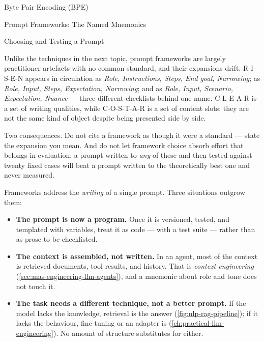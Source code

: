 \begin{v3topic}{Byte Pair Encoding (BPE)}
\begin{v3topic}{Prompt Frameworks: The Named Mnemonics}
\begin{v3topic}{Choosing and Testing a Prompt}
\begin{cautionbox}
Unlike the techniques in the next topic, prompt frameworks are largely
practitioner artefacts with no common standard, and their expansions drift.
R-I-S-E-N appears in circulation as \emph{Role, Instructions, Steps, End goal,
Narrowing}; as \emph{Role, Input, Steps, Expectation, Narrowing}; and as
\emph{Role, Input, Scenario, Expectation, Nuance} --- three different
checklists behind one name. C-L-E-A-R is a set of writing qualities, while
C-O-S-T-A-R is a set of content slots; they are not the same kind of object
despite being presented side by side.

Two consequences. Do not cite a framework as though it were a standard ---
state the expansion you mean. And do not let framework choice absorb effort
that belongs in evaluation: a prompt written to \emph{any} of these and then
tested against twenty fixed cases will beat a prompt written to the
theoretically best one and never measured.
\end{cautionbox}

\begin{engineernote}
Frameworks address the \emph{writing} of a single prompt. Three situations
outgrow them:
\begin{itemize}
  \item \textbf{The prompt is now a program.} Once it is versioned, tested,
        and templated with variables, treat it as code --- with a test suite ---
        rather than as prose to be checklisted.
  \item \textbf{The context is assembled, not written.} In an agent, most of
        the context is retrieved documents, tool results, and history. That is
        \emph{context engineering} (\cref{sec:mas-engineering-llm-agents}), and
        a mnemonic about role and tone does not touch it.
  \item \textbf{The task needs a different technique, not a better prompt.}
        If the model lacks the knowledge, retrieval is the answer
        (\cref{fig:nlp-rag-pipeline}); if it lacks the behaviour, fine-tuning
        or an adapter is (\cref{ch:practical-llm-engineering}). No amount of
        structure substitutes for either.
\end{itemize}
\end{engineernote}


\end{v3topic}
\end{v3topic}
\end{v3topic}

